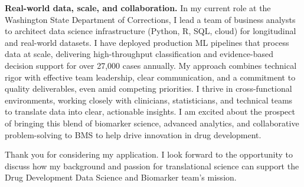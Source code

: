 \documentclass[10.5pt, letterpaper]{russell}
\begin{document}
\begin{cvletter}
  \textbf{Real-world data, scale, and collaboration.} In my current role at the Washington State Department of Corrections, I lead a team of business analysts to architect data science infrastructure (Python, R, SQL, cloud) for longitudinal and real-world datasets. I have deployed production ML pipelines that process data at scale, delivering high-throughput classification and evidence-based decision support for over 27,000 cases annually. My approach combines technical rigor with effective team leadership, clear communication, and a commitment to quality deliverables, even amid competing priorities. I thrive in cross-functional environments, working closely with clinicians, statisticians, and technical teams to translate data into clear, actionable insights. I am excited about the prospect of bringing this blend of biomarker science, advanced analytics, and collaborative problem-solving to BMS to help drive innovation in drug development.

 Thank you for considering my application. I look forward to the opportunity to discuss how my background and passion for translational science can support the Drug Development Data Science and Biomarker team’s mission.

\end{cvletter}

\makeletterclosing
\end{document}
